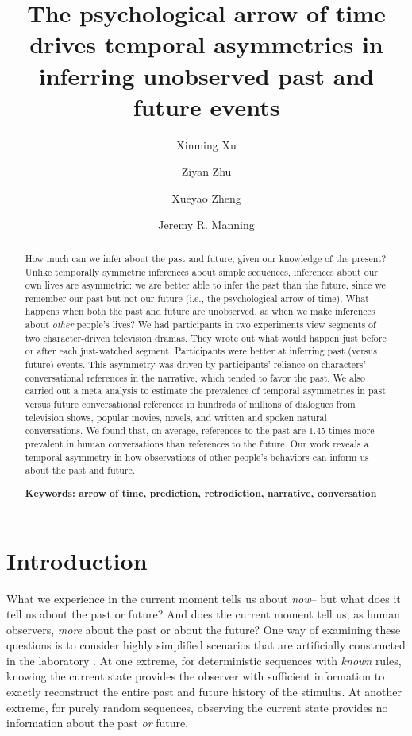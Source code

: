 \documentclass[10pt]{article}
\title{\Large The psychological arrow of time drives temporal asymmetries in inferring unobserved past and future events}
\author[1]{Xinming Xu}
\author[2]{Ziyan Zhu}
\author[3]{Xueyao Zheng}
\author[1, $\star$]{Jeremy R. Manning}
\affil[1]{Dartmouth College, Hanover, NH, USA}
\affil[2]{Peking University, Beijing, China}
\affil[3]{Beijing Normal University, Beijing, China}
\affil[$\star$]{Address correspondence to jeremy.r.manning@dartmouth.edu}
\begin{document}
\maketitle

\begin{abstract} {\footnotesize{ How much can we infer about the past and future, given our knowledge of the present? Unlike temporally symmetric inferences about simple sequences, inferences about our own lives are asymmetric: we are better able to infer the past than the future, since we remember our past but not our future (i.e., the psychological arrow of time). What happens when both the past and future are unobserved, as when we make inferences about \textit{other} people's lives? We had participants in two experiments view segments of two character-driven television dramas. They wrote out what would happen just before or after each just-watched segment. Participants were better at inferring past (versus future) events. This asymmetry was driven by participants’ reliance on characters’ conversational references in the narrative, which tended to favor the past. We also carried out a meta analysis to estimate the prevalence of temporal asymmetries in past versus future conversational references in hundreds of millions of dialogues from television shows, popular movies, novels, and written and spoken natural conversations. We found that, on average, references to the past are 1.45 times more prevalent in human conversations than references to the future. Our work reveals a temporal asymmetry in how observations of other people’s behaviors can inform us about the past and future.

\textbf{Keywords: arrow of time, prediction, retrodiction, narrative, conversation}}}

\end{abstract}

\section*{Introduction}
What we experience in the current moment tells us about \textit{now}-- but what does it tell us about the past or future? And does the current moment tell us, as human observers, \textit{more} about the past or about the future? One way of examining these questions is to consider highly simplified scenarios that are artificially constructed in the laboratory \citep[e.g., ][]{MaheEtal22}. At one extreme, for deterministic sequences with \textit{known} rules, knowing the current state provides the observer with sufficient information to exactly reconstruct the entire past and future history of the stimulus. At another extreme, for purely random sequences, observing the current state provides no information about the past \textit{or} future.
\end{document}
